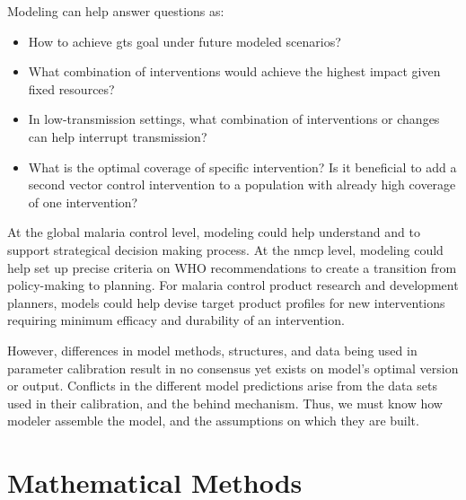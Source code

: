 \documentclass[a4paper, 12pt, twoside]{report}
\begin{document}
Modeling can help answer questions as:

\begin{itemize}
  \item How to achieve \gls{gts} goal under future modeled scenarios?
	\item What combination of interventions would achieve the highest impact given fixed resources?
	\item In low-transmission settings, what combination of interventions or changes can help interrupt transmission?
	\item What is the optimal coverage of specific intervention? Is it beneficial to add a second vector control intervention to a population with already high coverage of one intervention?
\end{itemize}

At the global malaria control level, modeling could help understand and to support strategical decision making process.
At the \gls{nmcp} level, modeling could help set up precise criteria on WHO recommendations to create a transition from policy-making to planning.
For malaria control product research and development planners, models could help devise target product profiles for new interventions requiring minimum efficacy and durability of an intervention.

However, differences in model methods, structures, and data being used in parameter calibration result in no consensus yet exists on model's optimal version or output.
Conflicts in the different model predictions arise from the data sets used in their calibration, and the behind mechanism.
Thus, we must know how modeler assemble the model, and the assumptions on which they are built.

\chapter{Mathematical Methods}


\end{document}
